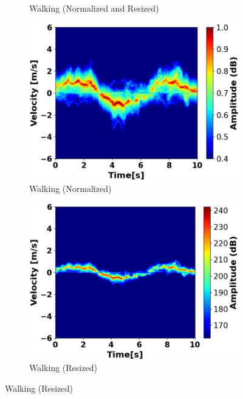 \documentclass{l4proj}
\begin{document}
\begin{appendices}
\begin{figure}[h]
\begin{subfigure}[b]{0.4\textwidth}
        \caption{Walking (Normalized and Resized)}
        \label{fig:velocity-time1-normalized-resized}
    \end{subfigure}
    \begin{subfigure}[b]{0.4\textwidth}
        \includegraphics[width=\textwidth]{images/Velocity-Time_1_normalized.png}
        \caption{Walking (Normalized)}
        \label{fig:velocity-time1-normalized}
    \end{subfigure}
    \qquad
    \qquad
    \begin{subfigure}[b]{0.4\textwidth}
        \includegraphics[width=\textwidth]{images/Velocity-Time_1_resized.png}
        \caption{Walking (Resized)}
        \label{fig:velocity-time1-resized}
    \end{subfigure}
    

\end{figure}
\end{appendices}
\end{document}
